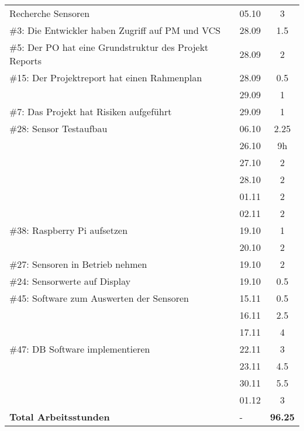 \documentclass[a4paper, 10pt, fleqn]{article}
\newcommand{\footer}{\midrule\textbf{Total Arbeitsstunden}&-&\textbf{96.25}\\\midrule\bottomrule}
\begin{document}
\begin{longtable}{p{9cm}|p{2cm}|c}
        Recherche Sensoren & 05.10 & 3\\
        \#3: Die Entwickler haben Zugriff auf PM und VCS& 28.09 & 1.5\\
        \#5: Der PO hat eine Grundstruktur des Projekt Reports& 28.09 & 2\\
        \#15: Der Projektreport hat einen Rahmenplan & 28.09 & 0.5\\
        & 29.09 & 1\\
        \#7: Das Projekt hat Risiken aufgeführt & 29.09 & 1\\
        \#28: Sensor Testaufbau & 06.10 & 2.25\\
        & 26.10 & 9h \\
        & 27.10 & 2\\
        & 28.10 & 2\\
        & 01.11 & 2\\
        & 02.11 & 2\\
        \#38: Raspberry Pi aufsetzen & 19.10 & 1\\
        & 20.10 & 2\\
        \#27: Sensoren in Betrieb nehmen & 19.10 & 2\\
        \#24: Sensorwerte auf Display & 19.10 & 0.5\\
        \#45: Software zum Auswerten der Sensoren & 15.11 & 0.5\\
        & 16.11 & 2.5\\
        & 17.11 & 4\\
        \#47: DB Software implementieren & 22.11 & 3\\
        & 23.11 & 4.5\\
        & 30.11 & 5.5\\
        & 01.12 & 3\\
        \footer
	\end{longtable}
\end{document}
